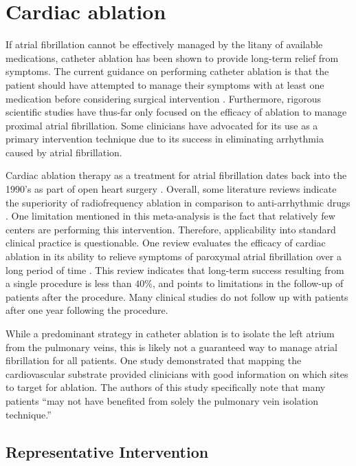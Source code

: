 \documentclass[letterpaper,10pt,conference]{ieeeconf}   %
\begin{document}
\section{Cardiac ablation}
\label{sec:ablation}

If atrial fibrillation cannot be effectively managed by the litany of available medications, catheter ablation has been shown to provide long-term relief from symptoms. The current guidance on performing catheter ablation is that the patient should have attempted to manage their symptoms with at least one medication before considering surgical intervention \cite{camm:10a}. Furthermore, rigorous scientific studies have thus-far only focused on the efficacy of ablation to manage proximal atrial fibrillation. Some clinicians have advocated for its use as a primary intervention technique due to its success in eliminating arrhythmia caused by atrial fibrillation. 

Cardiac ablation therapy as a treatment for atrial fibrillation dates back into the 1990's as part of open heart surgery \cite{cox:91a}. Overall, some literature reviews indicate the superiority of radiofrequency ablation in comparison to anti-arrhythmic drugs \cite{cappato:05a,calkins:09a}. One limitation mentioned in this meta-analysis is the fact that relatively few centers are performing this intervention. Therefore, applicability into standard clinical practice is questionable. One review evaluates the efficacy of cardiac ablation in its ability to relieve symptoms of paroxymal atrial fibrillation over a long period of time \cite{cheema2006long}. This review indicates that long-term success resulting from a single procedure is less than $40\%$, and points to limitations in the follow-up of patients after the procedure. Many clinical studies do not follow up with patients after one year following the procedure.  

While a predominant strategy in catheter ablation is to isolate the left atrium from the pulmonary veins, this is likely not a guaranteed way to manage atrial fibrillation for all patients. One study \cite{nademanee:04a} demonstrated that mapping the cardiovascular substrate provided clinicians with good information on which sites to target for ablation. The authors of this study specifically note that many patients ``may not have benefited from solely the pulmonary vein isolation technique.'' 

\subsection{Representative Intervention}
\label{sec:repintervention}
\end{document}
